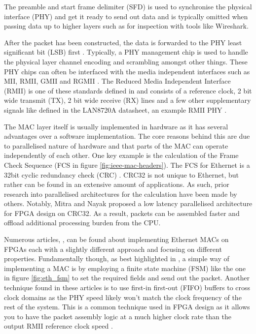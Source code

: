The preamble and start frame delimiter (SFD) is used to synchronise the physical interface (PHY) and get it ready to send out data and is typically omitted when passing data up to higher layers such as for inspection with tools like Wireshark.

After the packet has been constructed, the data is forwarded to the PHY least significant bit (LSB) first \cite{IEEE802.3-2012}. Typically, a PHY management chip is used to handle the physical layer channel encoding and scrambling amongst other things. 
These PHY chips can often be interfaced with the media independent interfaces such as MII, RMII, GMII and RGMII \cite{OptimisedEthernetMAC}. The Reduced Media Independent Interface (RMII) is one of these standards defined in \cite{IEEE802.3-2012} and consists of a reference clock, 2 bit wide transmit (TX), 2 bit wide receive (RX) lines and a few other supplementary signals like defined in the LAN8720A datasheet, an example RMII PHY \cite{LAN8720ADatasheet}.


The MAC layer itself is usually implemented in hardware as it has several advantages over a software implementation. The core reasons behind this are due to parallelised nature of hardware and that parts of the MAC can operate independently \cite{reducedEtherentMacFPGA} of each other. One key example is the calculation of the Frame Check Sequence (FCS in figure \ref{fig:ieee-mac-headers}). The FCS for Ethernet is a 32bit cyclic redundancy check (CRC) \cite{IEEE802.3-2012}. CRC32 is not unique to Ethernet, but rather can be found in an extensive amount of applications. As such, prior research into parallelised architectures for the calculation have been made by others. Notably, Mitra and Nayak \cite{ParallelCRC} proposed a low latency parallelised architecture for FPGA design on CRC32. As a result, packets can be assembled faster and offload additional processing burden from the CPU. 


Numerous articles, \cite{OptimisedEthernetMAC} \cite{EthernetAXI} \cite{EthernetRMII}, can be found about implementing Ethernet MACs 
on FPGAs each with a slightly different approach and focusing on different properties. Fundamentally though, as best highlighted in \cite{OptimisedEthernetMAC}, a simple way of implementing a MAC is by employing a finite state machine (FSM) like the one in figure \ref{fig:eth_fsm} to set the required fields and send out the packet. Another technique found in these articles is to use first-in first-out (FIFO) buffers to cross clock domains as the PHY speed likely won't match the clock frequency of the rest of the system. This is a common technique used in FPGA design as it allows you to have the packet assembly logic at a much higher clock rate than the output RMII reference clock speed \cite{EthernetAXI}. 


